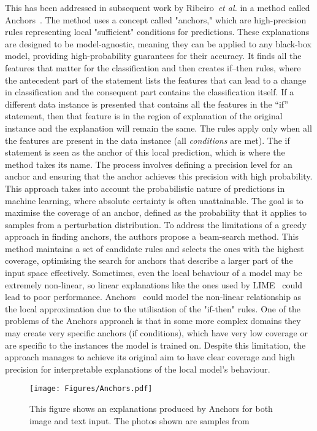 This has been addressed in subsequent work by Ribeiro~\textit{et al.} in a method called Anchors~\cite{Ribeiro0G18}. The method uses a concept called "anchors," which are high-precision rules representing local "sufficient" conditions for predictions. These explanations are designed to be model-agnostic, meaning they can be applied to any black-box model, providing high-probability guarantees for their accuracy. It finds all the features that matter for the classification and then creates if--then rules, where the antecedent part of the statement lists the features that can lead to a change in classification and the consequent part contains the classification itself. If a different data instance is presented that contains all the features in the ``if'' statement, then that feature is in the region of explanation of the original instance and the explanation will remain the same. The rules apply only when all the features are present in the data instance (all \emph{conditions} are met). The if statement is seen as the anchor of this local prediction, which is where the method takes its name. 
The process involves defining a precision level for an anchor and ensuring that the anchor achieves this precision with high probability. This approach takes into account the probabilistic nature of predictions in machine learning, where absolute certainty is often unattainable. The goal is to maximise the coverage of an anchor, defined as the probability that it applies to samples from a perturbation distribution. To address the limitations of a greedy approach in finding anchors, the authors propose a beam-search method. This method maintains a set of candidate rules and selects the ones with the highest coverage, optimising the search for anchors that describe a larger part of the input space effectively. Sometimes, even the local behaviour of a model may be
extremely non-linear, so linear explanations like the ones used by LIME~\cite{Ribeiro0G16} could lead to poor performance. Anchors~\cite{Ribeiro0G18} could model the non-linear relationship as the local approximation due to the utilisation of the "if-then" rules. One of the problems of the Anchors approach is that in some more complex domains they may create very specific anchors (if conditions), which have very low coverage or are specific to the instances the model is trained on. Despite this limitation, the approach manages to achieve its original aim to have clear coverage and high precision for interpretable explanations of the local model's behaviour. 


\begin{figure}[ht!]
	\begin{center}
		\texttt{[image: Figures/Anchors.pdf]}
	\end{center}
	\caption{This figure shows an explanations produced by Anchors for both image and text input. The photos shown are samples from~\cite{Ribeiro0G18}}
	\label{Fig:VAE}
\end{figure} 



